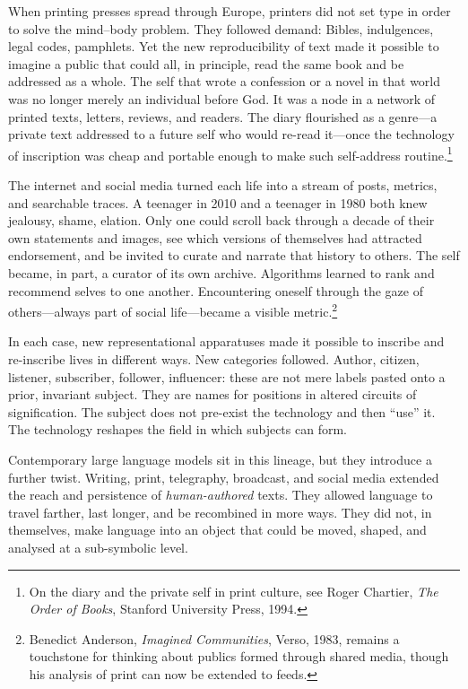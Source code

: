 When printing presses spread through Europe, printers did not set type in order to solve the mind--body problem. They followed demand: Bibles, indulgences, legal codes, pamphlets. Yet the new reproducibility of text made it possible to imagine a public that could all, in principle, read the same book and be addressed as a whole. The self that wrote a confession or a novel in that world was no longer merely an individual before God. It was a node in a network of printed texts, letters, reviews, and readers. The diary flourished as a genre---a private text addressed to a future self who would re-read it---once the technology of inscription was cheap and portable enough to make such self-address routine.\footnote{On the diary and the private self in print culture, see Roger Chartier, \emph{The Order of Books}, Stanford University Press, 1994.}

The internet and social media turned each life into a stream of posts, metrics, and searchable traces. A teenager in 2010 and a teenager in 1980 both knew jealousy, shame, elation. Only one could scroll back through a decade of their own statements and images, see which versions of themselves had attracted endorsement, and be invited to curate and narrate that history to others. The self became, in part, a curator of its own archive. Algorithms learned to rank and recommend selves to one another. Encountering oneself through the gaze of others---always part of social life---became a visible metric.\footnote{Benedict Anderson, \emph{Imagined Communities}, Verso, 1983, remains a touchstone for thinking about publics formed through shared media, though his analysis of print can now be extended to feeds.}

In each case, new representational apparatuses made it possible to inscribe and re-inscribe lives in different ways. New categories followed. Author, citizen, listener, subscriber, follower, influencer: these are not mere labels pasted onto a prior, invariant subject. They are names for positions in altered circuits of signification. The subject does not pre-exist the technology and then ``use'' it. The technology reshapes the field in which subjects can form.

Contemporary large language models sit in this lineage, but they introduce a further twist. Writing, print, telegraphy, broadcast, and social media extended the reach and persistence of \emph{human-authored} texts. They allowed language to travel farther, last longer, and be recombined in more ways. They did not, in themselves, make language into an object that could be moved, shaped, and analysed at a sub-symbolic level.

